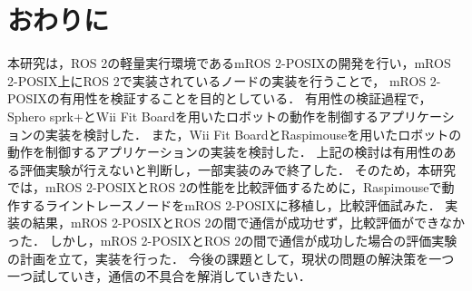 \chapter{おわりに}
本研究は，ROS 2の軽量実行環境であるmROS 2-POSIXの開発を行い，mROS 2-POSIX上にROS 2で実装されているノードの実装を行うことで，
mROS 2-POSIXの有用性を検証することを目的としている．
有用性の検証過程で，Sphero sprk+とWii Fit Boardを用いたロボットの動作を制御するアプリケーションの実装を検討した．
また，Wii Fit BoardとRaspimouseを用いたロボットの動作を制御するアプリケーションの実装を検討した．
上記の検討は有用性のある評価実験が行えないと判断し，一部実装のみで終了した．
そのため，本研究では，mROS 2-POSIXとROS 2の性能を比較評価するために，Raspimouseで動作するライントレースノードをmROS 2-POSIXに移植し，比較評価試みた．
実装の結果，mROS 2-POSIXとROS 2の間で通信が成功せず，比較評価ができなかった．
しかし，mROS 2-POSIXとROS 2の間で通信が成功した場合の評価実験の計画を立て，実装を行った．
今後の課題として，現状の問題の解決策を一つ一つ試していき，通信の不具合を解消していきたい．
